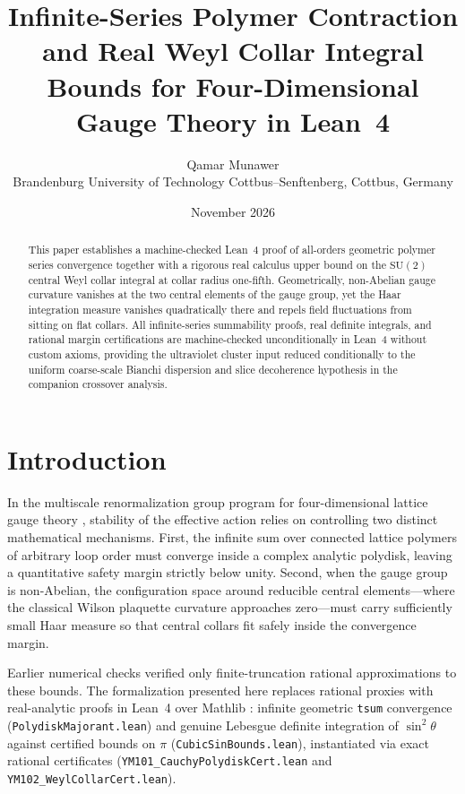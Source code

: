 \documentclass[11pt,a4paper]{article}
\title{Infinite-Series Polymer Contraction and Real Weyl Collar Integral Bounds for Four-Dimensional Gauge Theory in Lean~4}
\author{Qamar Munawer \\ \small Brandenburg University of Technology Cottbus--Senftenberg, Cottbus, Germany}
\date{November 2026}
\newcommand{\SU}{\mathrm{SU}}
\begin{document}
\maketitle

\begin{abstract}
This paper establishes a machine-checked Lean~4 proof of all-orders geometric polymer series convergence together with a rigorous real calculus upper bound on the $\SU(2)$ central Weyl collar integral at collar radius one-fifth. Geometrically, non-Abelian gauge curvature vanishes at the two central elements of the gauge group, yet the Haar integration measure vanishes quadratically there and repels field fluctuations from sitting on flat collars. All infinite-series summability proofs, real definite integrals, and rational margin certifications are machine-checked unconditionally in Lean~4 without custom axioms, providing the ultraviolet cluster input reduced conditionally to the uniform coarse-scale Bianchi dispersion and slice decoherence hypothesis in the companion crossover analysis.
\end{abstract}

\section{Introduction}
In the multiscale renormalization group program for four-dimensional lattice gauge theory \cite{Balaban1988CMP116,Balaban1989CMP122,KoteckyPreiss1986}, stability of the effective action relies on controlling two distinct mathematical mechanisms. First, the infinite sum over connected lattice polymers of arbitrary loop order must converge inside a complex analytic polydisk, leaving a quantitative safety margin strictly below unity. Second, when the gauge group is non-Abelian, the configuration space around reducible central elements---where the classical Wilson plaquette curvature approaches zero---must carry sufficiently small Haar measure so that central collars fit safely inside the convergence margin.

Earlier numerical checks verified only finite-truncation rational approximations to these bounds. The formalization presented here replaces rational proxies with real-analytic proofs in Lean~4 over Mathlib \cite{Mathlib4}: infinite geometric \texttt{tsum} convergence (\texttt{PolydiskMajorant.lean}) and genuine Lebesgue definite integration of $\sin^2\theta$ against certified bounds on $\pi$ (\texttt{CubicSinBounds.lean}), instantiated via exact rational certificates (\texttt{YM101\_\-CauchyPolydiskCert.lean} and \texttt{YM102\_\-WeylCollarCert.lean}).
\end{document}
